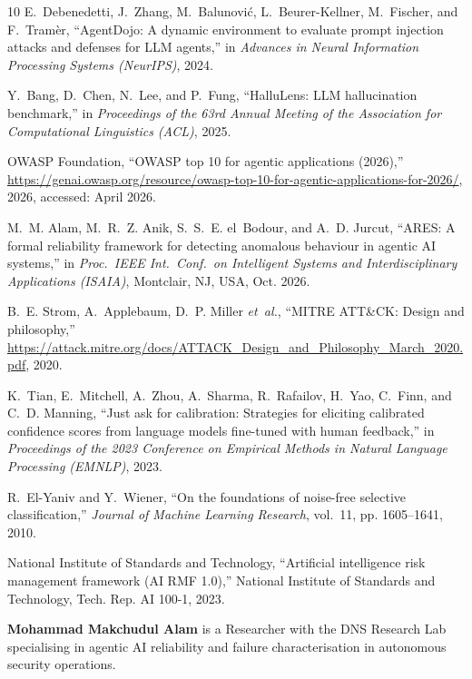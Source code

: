 \documentclass[journal,compsoc]{IEEEtran}
\begin{document}
\begin{thebibliography}{10}
E.~Debenedetti, J.~Zhang, M.~Balunovi{\'c}, L.~Beurer-Kellner, M.~Fischer, and
  F.~Tram{\`e}r, ``{AgentDojo}: A dynamic environment to evaluate prompt
  injection attacks and defenses for {LLM} agents,'' in \emph{Advances in
  Neural Information Processing Systems ({NeurIPS})}, 2024.

Y.~Bang, D.~Chen, N.~Lee, and P.~Fung, ``{HalluLens}: {LLM} hallucination
  benchmark,'' in \emph{Proceedings of the 63rd Annual Meeting of the
  Association for Computational Linguistics ({ACL})}, 2025.

{OWASP Foundation}, ``{OWASP} top 10 for agentic applications (2026),''
  \url{https://genai.owasp.org/resource/owasp-top-10-for-agentic-applications-for-2026/},
  2026, accessed: April 2026.

M.~M. Alam, M.~R.~Z. Anik, S.~S.~E. el~Bodour, and A.~D. Jurcut, ``{ARES}: A
  formal reliability framework for detecting anomalous behaviour in agentic
  {AI} systems,'' in \emph{Proc.\ IEEE Int.\ Conf.\ on Intelligent Systems and
  Interdisciplinary Applications (ISAIA)}, Montclair, NJ, USA, Oct. 2026.

B.~E. Strom, A.~Applebaum, D.~P. Miller \emph{et~al.}, ``{MITRE ATT\&CK}:
  Design and philosophy,''
  \url{https://attack.mitre.org/docs/ATTACK_Design_and_Philosophy_March_2020.pdf},
  2020.

K.~Tian, E.~Mitchell, A.~Zhou, A.~Sharma, R.~Rafailov, H.~Yao, C.~Finn, and
  C.~D. Manning, ``Just ask for calibration: Strategies for eliciting
  calibrated confidence scores from language models fine-tuned with human
  feedback,'' in \emph{Proceedings of the 2023 Conference on Empirical Methods
  in Natural Language Processing ({EMNLP})}, 2023.

R.~El-Yaniv and Y.~Wiener, ``On the foundations of noise-free selective
  classification,'' \emph{Journal of Machine Learning Research}, vol.~11, pp.
  1605--1641, 2010.

{National Institute of Standards and Technology}, ``Artificial intelligence
  risk management framework ({AI RMF} 1.0),'' National Institute of Standards
  and Technology, Tech. Rep. AI 100-1, 2023.

\end{thebibliography}

\balance

\renewenvironment{IEEEbiographynophoto}[1]{%
  \par\vspace{0.35em}%
  \noindent\textbf{#1}\space\ignorespaces}{%
  \par}
\begin{IEEEbiographynophoto}{Mohammad Makchudul Alam}
is a Researcher with the DNS Research Lab specialising in agentic
AI reliability and failure characterisation in autonomous security
operations.
\end{IEEEbiographynophoto}
\end{document}
